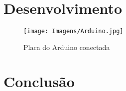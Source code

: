 \documentclass[11pt, a4paper, twocolumn]{article}
\begin{document}
\section{Desenvolvimento}

\begin{figure}[h]
    \caption{Placa do Arduino conectada}
    \centering
    \texttt{[image: Imagens/Arduino.jpg]}
\end{figure}

\section{Conclusão}
\end{document}
